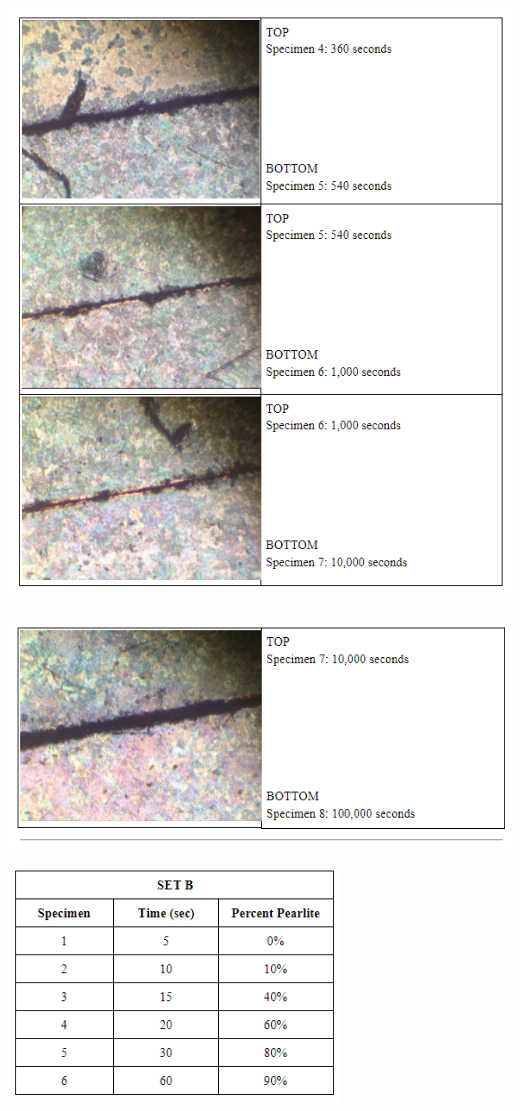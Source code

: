 \documentclass{article}
\begin{document}
\begin{center}
\includegraphics[width=400pt]{6.png}
\end{center}

\begin{center}
\includegraphics[width=400pt]{7.png}
\end{center}

\begin{center}
\includegraphics[width=250pt]{9.png}
\end{center}
\end{document}
